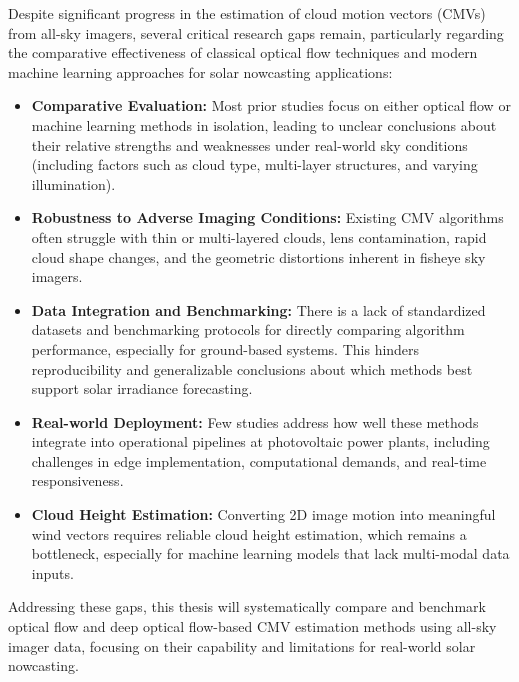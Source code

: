 Despite significant progress in the estimation of cloud motion vectors (CMVs) from all-sky imagers, several critical research gaps remain, particularly regarding the comparative effectiveness of classical optical flow techniques and modern machine learning approaches for solar nowcasting applications:

\begin{itemize}
\item \textbf{Comparative Evaluation:} Most prior studies focus on either optical flow or machine learning methods in isolation, leading to unclear conclusions about their relative strengths and weaknesses under real-world sky conditions (including factors such as cloud type, multi-layer structures, and varying illumination).

\item \textbf{Robustness to Adverse Imaging Conditions:} Existing CMV algorithms often struggle with thin or multi-layered clouds, lens contamination, rapid cloud shape changes, and the geometric distortions inherent in fisheye sky imagers.

\item \textbf{Data Integration and Benchmarking:} There is a lack of standardized datasets and benchmarking protocols for directly comparing algorithm performance, especially for ground-based systems. This hinders reproducibility and generalizable conclusions about which methods best support solar irradiance forecasting.

\item \textbf{Real-world Deployment:} Few studies address how well these methods integrate into operational pipelines at photovoltaic power plants, including challenges in edge implementation, computational demands, and real-time responsiveness.

\item \textbf{Cloud Height Estimation:} Converting 2D image motion into meaningful wind vectors requires reliable cloud height estimation, which remains a bottleneck, especially for machine learning models that lack multi-modal data inputs.
\end{itemize}

Addressing these gaps, this thesis will systematically compare and benchmark optical flow and deep optical flow-based CMV estimation methods using all-sky imager data, focusing on their capability and limitations for real-world solar nowcasting.
